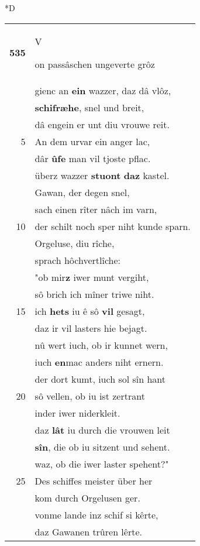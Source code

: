 \documentclass[8pt,a4paper,notitlepage]{article}
\begin{document}
\begin{table}[ht]
\begin{minipage}[t]{0.5\linewidth}
\small
\begin{center}*D
\end{center}
\begin{tabular}{rl}
\textbf{535} & \begin{large}V\end{large}on passâschen ungeverte grôz\\ 
 & gienc an \textbf{ein} wazzer, daz dâ vlôz,\\ 
 & \textbf{schifræhe}, snel und breit,\\ 
 & dâ engein er unt diu vrouwe reit.\\ 
5 & An dem urvar ein anger lac,\\ 
 & dâr \textbf{ûfe} man vil tjoste pflac.\\ 
 & überz wazzer \textbf{stuont} \textbf{daz} kastel.\\ 
 & Gawan, der degen snel,\\ 
 & sach einen rîter nâch im varn,\\ 
10 & der schilt noch sper niht kunde sparn.\\ 
 & Orgeluse, diu rîche,\\ 
 & sprach hôchvertlîche:\\ 
 & "ob mir\textbf{z} iwer munt vergiht,\\ 
 & sô brich ich mîner triwe niht.\\ 
15 & ich \textbf{het}\textbf{s} iu ê sô \textbf{vil} gesagt,\\ 
 & daz ir vil lasters hie bejagt.\\ 
 & nû wert iuch, ob ir kunnet wern,\\ 
 & iuch \textbf{en}mac anders niht ernern.\\ 
 & der dort kumt, iuch sol sîn hant\\ 
20 & sô vellen, ob iu ist zertrant\\ 
 & inder iwer niderkleit.\\ 
 & daz \textbf{lât} iu durch die vrouwen leit\\ 
 & \textbf{sîn}, die ob iu sitzent und sehent.\\ 
 & waz, ob die iwer laster spehent?"\\ 
25 & Des schiffes meister über her\\ 
 & kom durch Orgelusen ger.\\ 
 & vonme lande inz schif si kêrte,\\ 
 & daz Gawanen trûren lêrte.\\ 

\end{tabular}
\end{minipage}
\end{table}
\end{document}
